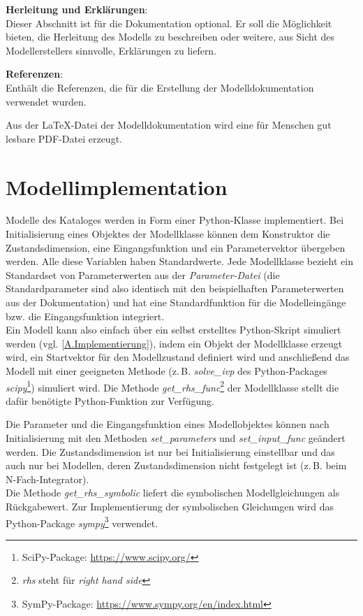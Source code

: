 \textbf{Herleitung und Erklärungen}:\\
Dieser Abschnitt ist für die Dokumentation optional. Er soll die Möglichkeit bieten, die Herleitung des Modells zu beschreiben oder weitere, aus Sicht des Modellerstellers sinnvolle, Erklärungen zu liefern.

\textbf{Referenzen}:\\
Enthält die Referenzen, die für die Erstellung der Modelldokumentation verwendet wurden.

Aus der \LaTeX-Datei der Modelldokumentation wird eine für Menschen gut lesbare PDF-Datei erzeugt. 

\section{Modellimplementation}
\label{Ch:Ergebnisse:Sec:Implementation}
Modelle des Kataloges werden in Form einer Python-Klasse implementiert. Bei Initialisierung eines Objektes der Modellklasse können dem Konstruktor die Zustandsdimension, eine Eingangsfunktion und ein Parametervektor übergeben werden. Alle diese Variablen haben Standardwerte. Jede Modellklasse bezieht ein Standardset von Parameterwerten aus der \textit{Parameter-Datei} (die Standardparameter sind also identisch mit den beispielhaften Parameterwerten aus der Dokumentation) und hat eine Standardfunktion für die Modelleingänge bzw. die Eingangsfunktion integriert.\\ 
Ein Modell kann also einfach über ein selbst erstelltes Python-Skript simuliert werden (vgl. \ref{A.Implementierung}), indem ein Objekt der Modellklasse erzeugt wird, ein Startvektor für den Modellzustand definiert wird und anschließend das Modell mit einer geeigneten Methode (z.\,B. \textit{solve\_ivp} des Python-Packages \textit{scipy}\footnote{SciPy-Package: \url{https://www.scipy.org/}}) simuliert wird. Die Methode \textit{get\_rhs\_func}\footnote{\textit{rhs} steht für \textit{right hand side}} der Modellklasse stellt die dafür benötigte Python-Funktion zur Verfügung.

Die Parameter und die Eingangsfunktion eines Modellobjektes können nach Initialisierung mit den Methoden \textit{set\_parameters} und \textit{set\_input\_func} geändert werden. Die Zustandsdimension ist nur bei Initialisierung einstellbar und das auch nur bei Modellen, deren Zustandsdimension nicht festgelegt ist (z.\,B. beim N-Fach-Integrator).\\
Die Methode \textit{get\_rhs\_symbolic} liefert die symbolischen Modellgleichungen als Rückgabewert. Zur Implementierung der symbolischen Gleichungen wird das Python-Package \textit{sympy}\footnote{SymPy-Package: \url{https://www.sympy.org/en/index.html}} verwendet.

